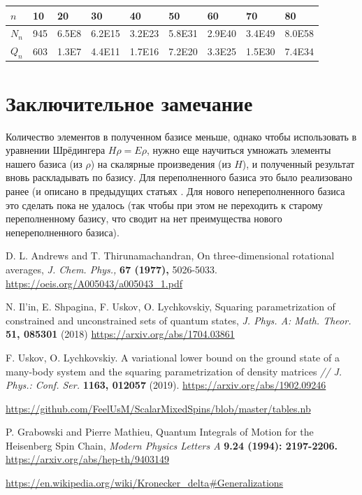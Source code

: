 \documentclass[]{article}
\renewcommand{\[}{\begin{equation}}
\renewcommand{\]}{\end{equation}}
\begin{document}
\begin{tabular}{ |l|l l l l l l l l| }
	\hline
	$n$   & 10  & 20    & 30     & 40     & 50     & 60     & 70     & 80
	\\ \hline
	$N_n$ & 945 & 6.5E8 & 6.2E15 & 3.2E23 & 5.8E31 & 2.9E40 & 3.4E49 & 8.0E58
	\\ %
	$Q_n$ & 603 & 1.3E7 & 4.4E11 & 1.7E16 & 7.2E20 & 3.3E25 & 1.5E30 & 7.4E34
	\\ \hline
\end{tabular}

\section{Заключительное замечание}
Количество элементов в полученном базисе меньше,
однако чтобы использовать в уравнении Шрёдингера $H \rho = E \rho$, нужно еще научиться умножать элементы нашего базиса (из $\rho$) на скалярные произведения (из $H$), и полученный результат вновь раскладывать по базису.
Для переполненного базиса это было реализовано ранее (и описано в предыдущих статьях \cite{variational}.
Для нового непереполненного базиса это сделать пока не удалось (так чтобы при этом не переходить к старому переполненному базису, что сводит на нет преимущества нового непереполненного базиса).

\begin{thebibliography}{3}
	D. L. Andrews and T. Thirunamachandran, On three-dimensional rotational averages, {\it J. Chem. Phys.,} {\bf 67 (1977),} 5026-5033.
	\href{https://oeis.org/A005043/a005043_1.pdf}
	{https://oeis.org/A005043/a005043\_1.pdf}
	
	 N. Il'in, E. Shpagina, F. Uskov, O. Lychkovskiy, 
	Squaring parametrization of constrained and unconstrained sets of quantum states, {\it J. Phys. A: Math. Theor.} {\bf 51, 085301} (2018)
	\href{https://arxiv.org/abs/1704.03861}{https://arxiv.org/abs/1704.03861}
	
	F. Uskov, O. Lychkovskiy. A variational lower bound on the ground state of a many-body system and
	the squaring parametrization of density matrices {\it// J. Phys.: Conf. Ser.} {\bf 1163, 012057} (2019).
	\href{https://arxiv.org/abs/1902.09246}{https://arxiv.org/abs/1902.09246}
	
	
	\href{https://github.com/FeelUsM/ScalarMixedSpins/blob/master/tables.nb}
	{https://github.com/FeelUsM/ScalarMixedSpins/blob/master/tables.nb}
	
	P. Grabowski and Pierre Mathieu, Quantum Integrals of Motion for the Heisenberg Spin Chain, {\it  Modern Physics Letters A} {\bf 9.24 (1994): 2197-2206.}
	\href{https://arxiv.org/abs/hep-th/9403149}{https://arxiv.org/abs/hep-th/9403149}
	
	\href{https://en.wikipedia.org/wiki/Kronecker_delta#Generalizations}
	{https://en.wikipedia.org/wiki/Kronecker\_delta\#Generalizations}
	
\end{thebibliography}
\end{document}
